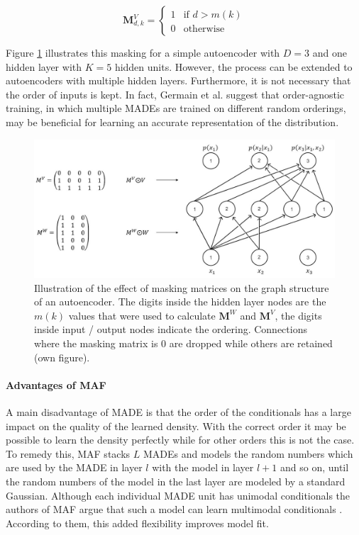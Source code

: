 \documentclass[11pt,titlepage,oneside,openany]{book}
\begin{document}
\begin{equation}
	\label{func:maskingV}
	\mathbf{M}_{d,k}^V = 
	\begin{cases}
		1 & \text{if $d > m(k)$}\\
		0 & \text{otherwise}
	\end{cases}
\end{equation}

\noindent Figure \ref{fig:MADE} illustrates this masking for a simple autoencoder with $D=3$ and one hidden layer with $K=5$ hidden units. However, the process can be extended to autoencoders with multiple hidden layers. Furthermore, it is not necessary that the order of inputs is kept. In fact, Germain et al. suggest that order-agnostic training, in which multiple MADEs are trained on different random orderings, may be beneficial \cite{germain_made_nodate} for learning an accurate representation of the distribution.

\begin{figure}[h]
	\centering
	\includegraphics[width=\linewidth]{MADE_vis.jpg}
	\caption[Illustration of MADE]{Illustration of the effect of masking matrices on the graph structure of an autoencoder. The digits inside the hidden layer nodes are the $m(k)$ values that were used to calculate $\mathbf{M}^W$ and $\mathbf{M}^V$, the digits inside input / output nodes indicate the ordering. Connections where the masking matrix is 0 are dropped while others are retained (own figure).}
	\label{fig:MADE}
\end{figure}

\paragraph{Advantages of MAF}
\noindent A main disadvantage of MADE is that the order of the conditionals has a large impact on the quality of the learned density. With the correct order it may be possible to learn the density perfectly while for other orders this is not the case. To remedy this, MAF stacks $L$ MADEs and models the random numbers which are used by the MADE in layer $l$ with the model in layer $l+1$ and so on, until the random numbers of the model in the last layer are modeled by a standard Gaussian. Although each individual MADE unit has unimodal conditionals the authors of MAF argue that such a model can learn multimodal conditionals \cite{papamakarios_masked_2017}. According to them, this added flexibility improves model fit.
\end{document}
